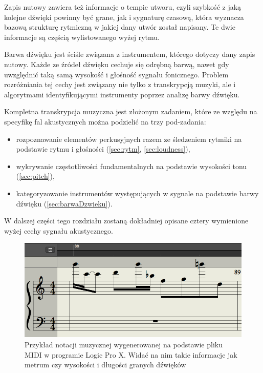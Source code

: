 \documentclass[12pt,a4paper,twoside]{mwart}
\begin{document}
Zapis nutowy zawiera też informacje o tempie utworu, czyli szybkość z jaką kolejne dźwięki powinny być grane, jak i sygnaturę czasową, która wyznacza bazową strukturę rytmiczną w jakiej dany utwór został napisany. Te dwie informacje są częścią wylistowanego wyżej rytmu.

Barwa dźwięku jest ściśle związana z instrumentem, którego dotyczy dany zapis nutowy. Każde ze źródeł dźwięku cechuje się odrębną barwą, nawet gdy uwzględnić taką samą wysokość i głośność sygnału fonicznego. Problem rozróżniania tej cechy jest związany nie tylko z transkrypcją muzyki, ale i algorytmami identyfikującymi instrumenty poprzez analizę barwy dźwięku.

Kompletna transkrypcja muzyczna jest złożonym zadaniem, które ze względu na specyfikę fal akustycznych można podzielić na trzy pod-zadania:
\begin{itemize}
  \item rozpoznawanie elementów perkusyjnych razem ze śledzeniem rytmiki na podstawie rytmu i głośności (\ref{sec:rytm}, \ref{sec:loudness}),
  \item wykrywanie częstotliwości fundamentalnych na podstawie wysokości tonu (\ref{sec:pitch}),
  \item  kategoryzowanie instrumentów występujących w sygnale na podstawie barwy dźwięku (\ref{sec:barwaDzwieku}).
\end{itemize}
W dalszej części tego rozdziału zostaną dokładniej opisane cztery wymienione wyżej cechy sygnału akustycznego.

\begin{figure}[h]
  \begin{center}
    \includegraphics[scale=0.5]{images/pieciolinia_logic.png}
    \caption{Przykład notacji muzycznej wygenerowanej na podstawie pliku MIDI w programie Logic Pro X. Widać na nim takie informacje jak metrum czy wysokości i długości granych dźwięków}
  \end{center}
\end{figure}
\end{document}
